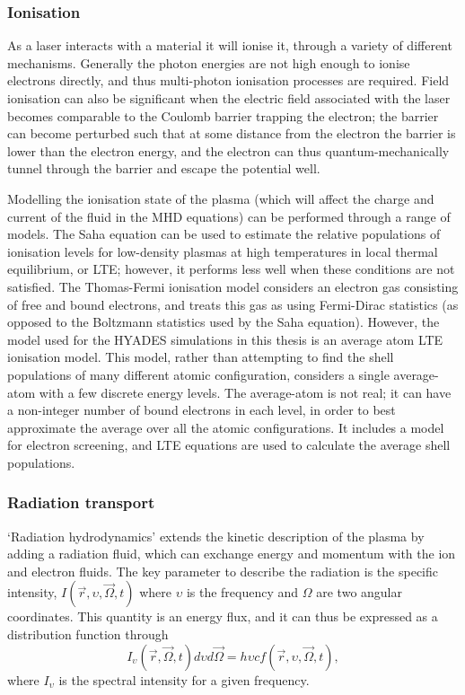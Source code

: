 \subsubsection{Ionisation}
As a laser interacts with a material it will ionise it, through a variety of different mechanisms. Generally the photon energies are not high enough to ionise electrons directly, and thus multi-photon ionisation processes are required. Field ionisation can also be significant when the electric field associated with the laser becomes comparable to the Coulomb barrier trapping the electron; the barrier can become perturbed such that at some distance from the electron the barrier is lower than the electron energy, and the electron can thus quantum-mechanically tunnel through the barrier and escape the potential well.

Modelling the ionisation state of the plasma (which will affect the charge and current of the fluid in the MHD equations) can be performed through a range of models. The Saha equation can be used to estimate the relative populations of ionisation levels for low-density plasmas at high temperatures in local thermal equilibrium, or LTE; however, it performs less well when these conditions are not satisfied. The Thomas-Fermi ionisation model considers an electron gas consisting of free and bound electrons, and treats this gas as using Fermi-Dirac statistics (as opposed to the Boltzmann statistics used by the Saha equation). However, the model used for the HYADES simulations in this thesis is an average atom LTE ionisation model. This model, rather than attempting to find the shell populations of many different atomic configuration, considers a single average-atom with a few discrete energy levels. The average-atom is not real; it can have a non-integer number of bound electrons in each level, in order to best approximate the average over all the atomic configurations. It includes a model for electron screening, and LTE equations are used to calculate the average shell populations. 

\subsubsection{Radiation transport}
`Radiation hydrodynamics' extends the kinetic description of the plasma by adding a radiation fluid, which can exchange energy and momentum with the ion and electron fluids. The key parameter to describe the radiation is the specific intensity, $I(\vec{r}, \upsilon, \vec{\Omega}, t)$ where $\upsilon$ is the frequency and $\Omega$ are two angular coordinates. This quantity is an energy flux, and it can thus be expressed as a distribution function through 
\begin{equation} I_{\upsilon}(\vec{r}, \vec{\Omega}, t) d\upsilon d\vec{\Omega} = h \upsilon c f(\vec{r}, \upsilon, \vec{\Omega}, t), \end{equation}
where $I_{\upsilon}$ is the spectral intensity for a given frequency.

